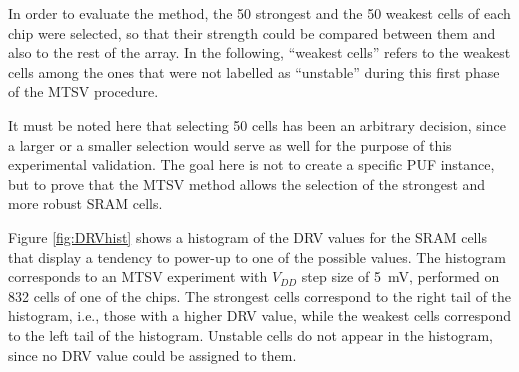 
In order to evaluate the method, the 50 strongest and the 50 weakest cells of each chip were selected, so that their strength could be compared between them and also to the rest of the array. In the following, “weakest cells” refers to the weakest cells among the ones that were not labelled as “unstable” during this first phase of the MTSV procedure. 

It must be noted here that selecting 50 cells has been an arbitrary decision, since a larger or a smaller selection would serve as well for the purpose of this experimental validation. The goal here is not to create a specific PUF instance, but to prove that the MTSV method allows the selection of the strongest and more robust SRAM cells.

Figure \ref{fig:DRVhist} shows a histogram of the DRV values for the SRAM cells that display a tendency to power-up to one of the possible values. The histogram corresponds to an MTSV experiment with $V_{DD}$ step size of \SI{5}{mV}, performed on 832 cells of one of the chips. The strongest cells correspond to the right tail of the histogram, i.e., those with a higher DRV value, while the weakest cells correspond to the left tail of the histogram. Unstable cells do not appear in the histogram, since no DRV value could be assigned to them.

